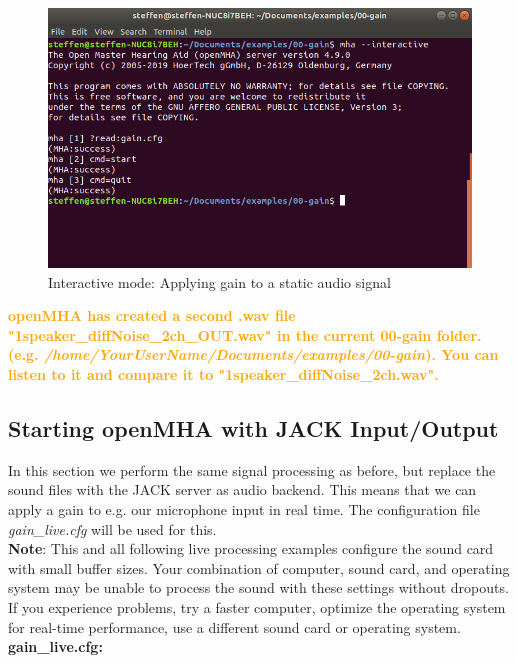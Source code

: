 \documentclass[11pt,a4paper,twoside]{article}
\newcommand{\+}{\discretionary{\mbox{\scriptsize$\hookleftarrow$}}{}{}}
\begin{document}
{{\begin{figure}[H]
\centering
\includegraphics[scale=0.4]{static_gain.png}
\caption{Interactive mode: Applying gain to a static audio signal}
\end{figure}

\textcolor{orange}{\textbf{openMHA has created a second .wav file "1speaker\_diffNoise\_2ch\_OUT.wav" in the current 00-gain folder. (e.g. \textit{/home/YourUserName/Documents/examples/00-gain}). You can listen to it and compare it to "1speaker\_diffNoise\_2ch.wav".}}

\newpage

\subsection{Starting openMHA with JACK Input/Output}

In this section we perform the same signal processing as before, but replace the sound files with the JACK server as audio backend. This means that we can apply a gain to e.g. our microphone input in real time. The configuration file {{\ttfamily \textit{gain\_live.cfg}}} will be used for this. \\

\large{\textbf{Note}}:
This and all following live processing examples configure
the sound card with small buffer sizes. Your combination of
computer, sound card, and operating system may be unable
to process the sound with these settings without dropouts.
If you experience problems, try a faster computer, optimize
the operating system for real-time performance, use a
different sound card or operating system.
\\

\textbf{gain\_live.cfg:}

}}
\end{document}
